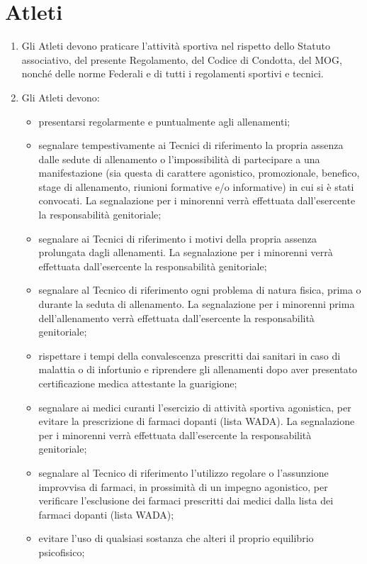 \documentclass{djtsasddoc}
\begin{document}
	\section{Atleti}
	\begin{enumerate}
		\item Gli Atleti devono praticare l'attività sportiva nel rispetto dello Statuto associativo, del presente Regolamento, del Codice di Condotta, del MOG, nonché delle norme Federali e di tutti i regolamenti sportivi e tecnici.
		\item Gli Atleti devono:
		\begin{itemize}
			\item presentarsi regolarmente e puntualmente agli allenamenti;
			\item segnalare tempestivamente ai Tecnici di riferimento la propria assenza dalle sedute di allenamento o l'impossibilità di partecipare a una manifestazione (sia questa di carattere agonistico, promozionale, benefico, stage di allenamento, riunioni formative e/o informative) in cui si è stati convocati. La segnalazione per i minorenni verrà effettuata dall'esercente la responsabilità genitoriale;
			\item segnalare ai Tecnici di riferimento i motivi della propria assenza prolungata dagli allenamenti. La segnalazione per i minorenni verrà effettuata dall'esercente la responsabilità genitoriale;
			\item segnalare al Tecnico di riferimento ogni problema di natura fisica, prima o durante la seduta di allenamento. La segnalazione per i minorenni prima dell'allenamento verrà effettuata dall'esercente la responsabilità genitoriale;
			\item rispettare i tempi della convalescenza prescritti dai sanitari in caso di malattia o di infortunio e riprendere gli allenamenti dopo aver presentato certificazione medica attestante la guarigione;
			\item segnalare ai medici curanti l'esercizio di attività sportiva agonistica, per evitare la prescrizione di farmaci dopanti (lista WADA). La segnalazione per i minorenni verrà effettuata dall'esercente la responsabilità genitoriale;
			\item segnalare al Tecnico di riferimento l'utilizzo regolare o l'assunzione improvvisa di farmaci, in prossimità di un impegno agonistico, per verificare l'esclusione dei farmaci prescritti dai medici dalla lista dei farmaci dopanti (lista WADA);
			\item evitare l'uso di qualsiasi sostanza che alteri il proprio equilibrio psicofisico;

\end{itemize}
\end{enumerate}
\end{document}
